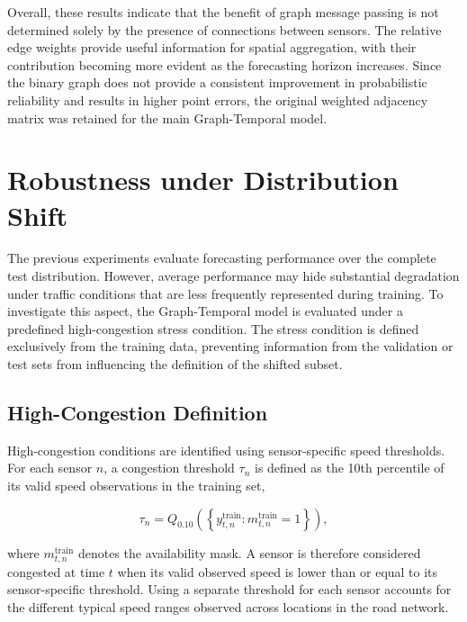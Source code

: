 Overall, these results indicate that the benefit of graph message passing is
not determined solely by the presence of connections between sensors. The
relative edge weights provide useful information for spatial aggregation,
with their contribution becoming more evident as the forecasting horizon
increases. Since the binary graph does not provide a consistent improvement
in probabilistic reliability and results in higher point errors,
the original weighted adjacency matrix was retained for the main
Graph-Temporal model.


\section{Robustness under Distribution Shift}
\label{sec:distribution_shift}

The previous experiments evaluate forecasting performance over the complete
test distribution. However, average performance may hide substantial
degradation under traffic conditions that are less frequently represented
during training. To investigate this aspect, the Graph-Temporal model is
evaluated under a predefined high-congestion stress condition. The stress
condition is defined exclusively from the training data, preventing
information from the validation or test sets from influencing the definition
of the shifted subset.

\subsection{High-Congestion Definition}
\label{subsec:congestion_definition}

High-congestion conditions are identified using sensor-specific speed
thresholds. For each sensor $n$, a congestion threshold $\tau_n$ is defined
as the 10th percentile of its valid speed observations in the training set,

\begin{equation}
    \tau_n =
    Q_{0.10}
    \left(
        \left\{y_{t,n}^{\mathrm{train}} :
        m_{t,n}^{\mathrm{train}} = 1\right\}
    \right),
    \label{eq:sensor_congestion_threshold}
\end{equation}

where $m_{t,n}^{\mathrm{train}}$ denotes the availability mask. A sensor is
therefore considered congested at time $t$ when its valid observed speed is
lower than or equal to its sensor-specific threshold. Using a separate
threshold for each sensor accounts for the different typical speed ranges
observed across locations in the road network.

